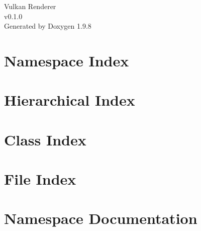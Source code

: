 \documentclass[twoside]{book}
\newcommand{\+}{\discretionary{\mbox{\scriptsize$\hookleftarrow$}}{}{}}
\newcommand{\clearemptydoublepage}{%
    \newpage{\pagestyle{empty}\cleardoublepage}%
  }
\begin{document}
  \raggedbottom
    \hypersetup{pageanchor=false,
                bookmarksnumbered=true,
                pdfencoding=unicode
               }
  \begin{titlepage}
  \vspace*{7cm}
  \begin{center}%
  {\Large Vulkan Renderer}\\
  [1ex]\large v0.\+1.\+0 \\
  \vspace*{1cm}
  {\large Generated by Doxygen 1.9.8}\\
  \end{center}
  \end{titlepage}
  \clearemptydoublepage
  \tableofcontents
  \clearemptydoublepage
  \hypersetup{pageanchor=true}





\chapter{Namespace Index}

\chapter{Hierarchical Index}

\chapter{Class Index}

\chapter{File Index}

\chapter{Namespace Documentation}





\end{document}
